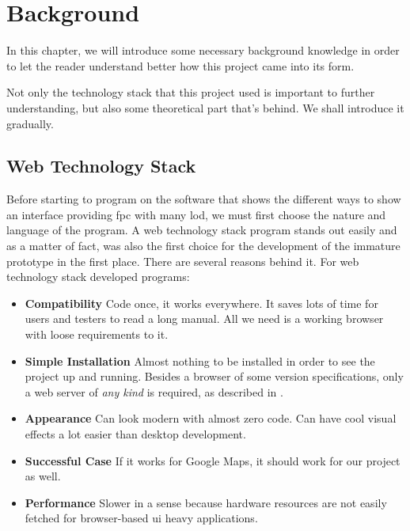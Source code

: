 
\chapter{Background} %

\label{Chapter2} %

In this chapter, we will introduce some necessary background knowledge in order to let the reader understand better how this project came into its form.

Not only the technology stack that this project used is important to further understanding, but also some theoretical part that's behind. We shall introduce it gradually.


\section{Web Technology Stack}

Before starting to program on the software that shows the different ways to show an interface providing \gls{fpc} with many \gls{lod}, we must first choose the nature and language of the program. A web technology stack program stands out easily and as a matter of fact, was also the first choice for the development of the immature prototype in the first place. There are several reasons behind it. For web technology stack developed programs:

\begin{itemize}
    \item \textbf{Compatibility} Code once, it works everywhere. It saves lots of time for users and testers to read a long manual. All we need is a working browser with loose requirements to it.
    \item \textbf{Simple Installation} Almost nothing to be installed in order to see the project up and running. Besides a browser of some version specifications, only a web server of \emph{any kind} is required, as described in .
    \item \textbf{Appearance} Can look modern with almost zero code. Can have cool visual effects a lot easier than desktop development. 
    \item \textbf{Successful Case} If it works for Google Maps, it should work for our project as well.
    \item \textbf{Performance} Slower in a sense because hardware resources are not easily fetched for browser-based \gls{ui} heavy applications.
\end{itemize}

